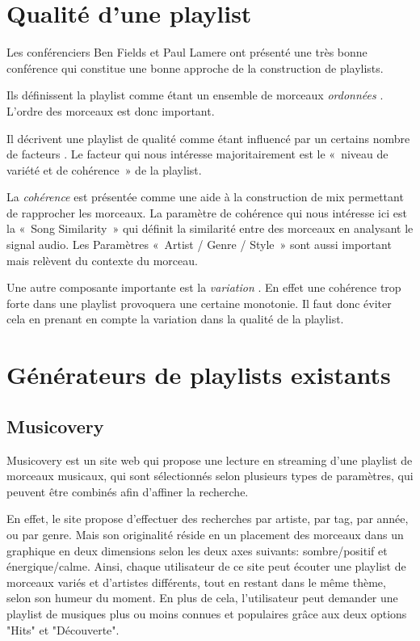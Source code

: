 
\section{Qualité d'une playlist}
\label{existant:qualite}

Les conférenciers Ben Fields et Paul Lamere ont présenté une très bonne
conférence \cite{ismir2010:playlist-tutorial} qui constitue une bonne approche
de la construction de playlists.

Ils définissent la playlist comme étant un ensemble de morceaux \emph{ordonnées}
\cite[p.~7]{ismir2010:playlist-tutorial}. L'ordre des morceaux est donc
important.

Il décrivent une playlist de qualité comme étant influencé par un certains
nombre de facteurs \cite[p.~17--18]{ismir2010:playlist-tutorial}. Le facteur qui
nous intéresse majoritairement est le «~niveau de variété et de cohérence~» de
la playlist.

La \emph{cohérence} est présentée \cite[p.~21 -- 23]{ismir2010:playlist-tutorial}
comme une aide à la construction de mix permettant de rapprocher les morceaux.
La paramètre de cohérence qui nous intéresse ici est la «~Song Similarity~» qui
définit la similarité entre des morceaux en analysant le signal audio.
Les Paramètres «~Artist / Genre / Style~» sont aussi important mais relèvent du
contexte du morceau.

Une autre composante importante est la \emph{variation} 
\cite[p.~32]{ismir2010:playlist-tutorial}. En effet une cohérence trop forte
dans une playlist provoquera une certaine monotonie. Il faut donc éviter cela
en prenant en compte la variation dans la qualité de la playlist.

\section{Générateurs de playlists existants}
\label{existant:generateurs}

\subsection{Musicovery}
\label{existant:musicovery}

Musicovery est un site web qui propose une lecture en streaming d'une 
playlist de morceaux musicaux, qui sont sélectionnés selon plusieurs types 
de paramètres, qui peuvent être combinés afin d'affiner la recherche.

En effet, le site propose d'effectuer des recherches par artiste, par tag, 
par année, ou par genre. Mais son originalité réside en un placement des 
morceaux dans un graphique en deux dimensions selon les deux axes suivants:
sombre/positif et énergique/calme.
Ainsi, chaque utilisateur de ce site peut écouter une playlist de morceaux 
variés et d'artistes différents, tout en restant dans le même thème, selon 
son humeur du moment.
En plus de cela, l'utilisateur peut demander une playlist de musiques plus 
ou moins connues et populaires grâce aux deux options "Hits" et "Découverte".

